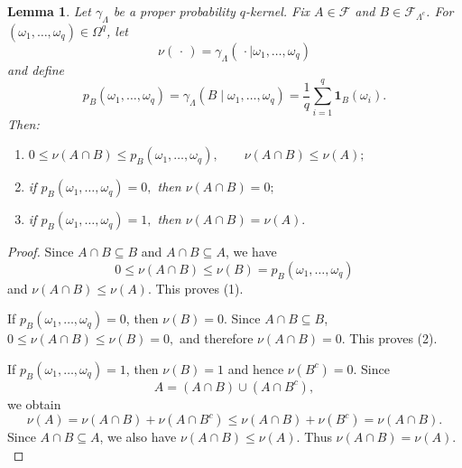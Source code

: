 \documentclass[11pt,reqno]{amsart}
\newtheorem{lemma}{Lemma}
\numberwithin{equation}{section} \setcounter{tocdepth}{1}
\begin{document}
\begin{lemma}\label{mg}
	Let $\gamma_\Lambda$ be a proper probability $q$-kernel. Fix
	$A\in\mathcal F$ and $B\in\mathcal F_{\Lambda^c}$. For
	$(\omega_1,\ldots,\omega_q)\in\Omega^q$, let
	\[
	\nu(\,\cdot\,)
	=
	\gamma_\Lambda(\,\cdot\mid\omega_1,\ldots,\omega_q)
	\]
	and define
	\[
	p_B(\omega_1,\ldots,\omega_q)
	=
	\gamma_\Lambda(B\mid\omega_1,\ldots,\omega_q)
	=
	\frac1q\sum_{i=1}^q\mathbf 1_B(\omega_i).
	\]
	Then:
	\begin{enumerate}
		\item[(1)]
		$
		0\le
		\nu(A\cap B)
		\le
		p_B(\omega_1,\ldots,\omega_q),
		\qquad
		\nu(A\cap B)\le\nu(A);
		$
				\item[(2)] if
		$
		p_B(\omega_1,\ldots,\omega_q)=0,
		$
		then
		$
		\nu(A\cap B)=0;
		$
				\item[(3)] if
		$
		p_B(\omega_1,\ldots,\omega_q)=1,
		$
		then
		$
		\nu(A\cap B)=\nu(A).
		$
	\end{enumerate}
\end{lemma}
\begin{proof}
	Since $	A\cap B\subseteq B$ and $A\cap B\subseteq A$,
	we have
	\[
	0\le\nu(A\cap B)\le\nu(B)
	=
	p_B(\omega_1,\ldots,\omega_q)
	\]
	and
	$
	\nu(A\cap B)\le\nu(A).
	$
	This proves (1).
	
	If
	$p_B(\omega_1,\ldots,\omega_q)=0$, then
	$
	\nu(B)=0.
	$
	Since $A\cap B\subseteq B$,
	$
	0\le\nu(A\cap B)\le\nu(B)=0,
	$
	and therefore
	$
	\nu(A\cap B)=0.
	$
	This proves (2).
	
	If
	$p_B(\omega_1,\ldots,\omega_q)=1$, then
	$
	\nu(B)=1$ and hence $\nu(B^c)=0$.
	Since
	$$
	A=(A\cap B)\cup(A\cap B^c),
	$$
	we obtain
	$$
			\nu(A)
		=
		\nu(A\cap B)+\nu(A\cap B^c)
		\le
		\nu(A\cap B)+\nu(B^c)
		=
		\nu(A\cap B).
		$$
	Since $A\cap B\subseteq A$, we also have
	$
	\nu(A\cap B)\le\nu(A).
	$
	Thus
	$
	\nu(A\cap B)=\nu(A).
	$
\end{proof}
\end{document}
